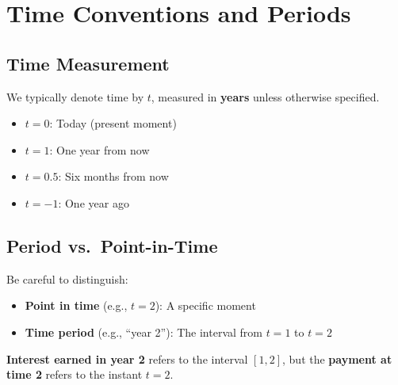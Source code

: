 \documentclass[
  letterpaper,
]{scrbook}
\providecommand{\tightlist}{%
  \setlength{\itemsep}{0pt}\setlength{\parskip}{0pt}}
\begin{document}
\section{Time Conventions and
Periods}\label{time-conventions-and-periods}

\subsection{Time Measurement}\label{time-measurement}

\begin{tcolorbox}[enhanced jigsaw, toptitle=1mm, colbacktitle=quarto-callout-note-color!10!white, opacityback=0, leftrule=.75mm, breakable, colframe=quarto-callout-note-color-frame, toprule=.15mm, opacitybacktitle=0.6, coltitle=black, bottomrule=.15mm, colback=white, arc=.35mm, titlerule=0mm, rightrule=.15mm, left=2mm, title=\textcolor{quarto-callout-note-color}{\faInfo}\hspace{0.5em}{Definition: Time Index}, bottomtitle=1mm]

We typically denote time by \(t\), measured in \textbf{years} unless
otherwise specified.

\begin{itemize}
\tightlist
\item
  \(t = 0\): Today (present moment)
\item
  \(t = 1\): One year from now
\item
  \(t = 0.5\): Six months from now
\item
  \(t = -1\): One year ago
\end{itemize}

\end{tcolorbox}

\subsection{Period vs.~Point-in-Time}\label{period-vs.-point-in-time}

Be careful to distinguish:

\begin{itemize}
\tightlist
\item
  \textbf{Point in time} (e.g., \(t=2\)): A specific moment
\item
  \textbf{Time period} (e.g., ``year 2''): The interval from \(t=1\) to
  \(t=2\)
\end{itemize}

\textbf{Interest earned in year 2} refers to the interval \([1, 2]\),
but the \textbf{payment at time 2} refers to the instant \(t=2\).
\end{document}
